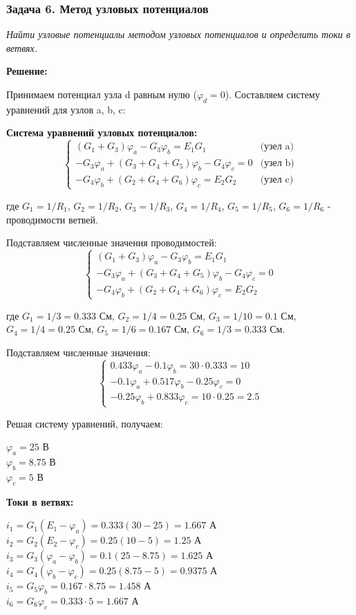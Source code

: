 \subsubsection{Задача 6. Метод узловых потенциалов}
\textit{Найти узловые потенциалы методом узловых потенциалов и определить токи в ветвях.}

\textbf{Решение:}

Принимаем потенциал узла d равным нулю ($\varphi_d = 0$). Составляем систему уравнений для узлов a, b, c:

\textbf{Система уравнений узловых потенциалов:}
$$\begin{cases}
(G_1 + G_3)\varphi_a - G_3\varphi_b = E_1 G_1 & \text{(узел a)} \\
-G_3\varphi_a + (G_3 + G_4 + G_5)\varphi_b - G_4\varphi_c = 0 & \text{(узел b)} \\
-G_4\varphi_b + (G_2 + G_4 + G_6)\varphi_c = E_2 G_2 & \text{(узел c)}
\end{cases}$$

где $G_1 = 1/R_1$, $G_2 = 1/R_2$, $G_3 = 1/R_3$, $G_4 = 1/R_4$, $G_5 = 1/R_5$, $G_6 = 1/R_6$ - проводимости ветвей.

Подставляем численные значения проводимостей:
$$\begin{cases}
(G_1 + G_3)\varphi_a - G_3\varphi_b = E_1 G_1 \\
-G_3\varphi_a + (G_3 + G_4 + G_5)\varphi_b - G_4\varphi_c = 0 \\
-G_4\varphi_b + (G_2 + G_4 + G_6)\varphi_c = E_2 G_2
\end{cases}$$

где $G_1 = 1/3 = 0.333$ См, $G_2 = 1/4 = 0.25$ См, $G_3 = 1/10 = 0.1$ См, $G_4 = 1/4 = 0.25$ См, $G_5 = 1/6 = 0.167$ См, $G_6 = 1/3 = 0.333$ См.

Подставляем численные значения:
$$\begin{cases}
0.433\varphi_a - 0.1\varphi_b = 30 \cdot 0.333 = 10 \\
-0.1\varphi_a + 0.517\varphi_b - 0.25\varphi_c = 0 \\
-0.25\varphi_b + 0.833\varphi_c = 10 \cdot 0.25 = 2.5
\end{cases}$$

Решая систему уравнений, получаем:
\begin{flushleft}
$\varphi_a = 25$ В \\
$\varphi_b = 8.75$ В \\
$\varphi_c = 5$ В
\end{flushleft}

\textbf{Токи в ветвях:}
\begin{flushleft}
$i_1 = G_1(E_1 - \varphi_a) = 0.333(30 - 25) = 1.667$ А \\
$i_2 = G_2(E_2 - \varphi_c) = 0.25(10 - 5) = 1.25$ А \\
$i_3 = G_3(\varphi_a - \varphi_b) = 0.1(25 - 8.75) = 1.625$ А \\
$i_4 = G_4(\varphi_b - \varphi_c) = 0.25(8.75 - 5) = 0.9375$ А \\
$i_5 = G_5\varphi_b = 0.167 \cdot 8.75 = 1.458$ А \\
$i_6 = G_6\varphi_c = 0.333 \cdot 5 = 1.667$ А
\end{flushleft}


